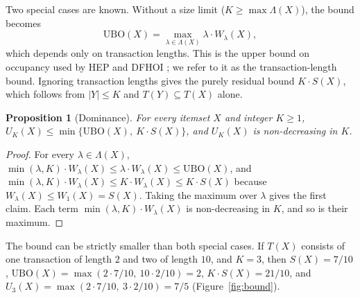 \documentclass[pdflatex,sn-mathphys,Numbered]{sn-jnl}
\theoremstyle{thmstyleone}
\newtheorem{proposition}[theorem]{Proposition}
\theoremstyle{thmstyletwo}
\theoremstyle{thmstylethree}
\newcommand{\Ubo}{\mathrm{UBO}}
\newcommand{\Ucap}{U}
\begin{document}
Two special cases are known. Without a size limit ($K \ge \max \Lambda(X)$), the bound becomes
\begin{equation}\label{eq:ubo}
\Ubo(X) = \max_{\lambda \in \Lambda(X)} \lambda \cdot W_\lambda(X),
\end{equation}
which depends only on transaction lengths. This is the upper bound on occupancy used by HEP and DFHOI \cite{deng2020hoi,nguyen2023dfhoi}; we refer to it as the transaction-length bound. Ignoring transaction lengths gives the purely residual bound $K \cdot S(X)$, which follows from $|Y| \le K$ and $T(Y) \subseteq T(X)$ alone.

\begin{proposition}[Dominance]\label{prop:dominance}
For every itemset $X$ and integer $K \ge 1$, $\Ucap_K(X) \le \min\{\Ubo(X),\ K \cdot S(X)\}$, and $\Ucap_K(X)$ is non-decreasing in $K$.
\end{proposition}
\begin{proof}
For every $\lambda \in \Lambda(X)$, $\min(\lambda, K) \cdot W_\lambda(X) \le \lambda \cdot W_\lambda(X) \le \Ubo(X)$, and $\min(\lambda, K) \cdot W_\lambda(X) \le K \cdot W_\lambda(X) \le K \cdot S(X)$ because $W_\lambda(X) \le W_1(X) = S(X)$. Taking the maximum over $\lambda$ gives the first claim. Each term $\min(\lambda,K) \cdot W_\lambda(X)$ is non-decreasing in $K$, and so is their maximum.
\end{proof}

The bound can be strictly smaller than both special cases. If $T(X)$ consists of one transaction of length $2$ and two of length $10$, and $K = 3$, then $S(X) = 7/10$, $\Ubo(X) = \max(2 \cdot 7/10,\ 10 \cdot 2/10) = 2$, $K \cdot S(X) = 21/10$, and $\Ucap_3(X) = \max(2 \cdot 7/10,\ 3 \cdot 2/10) = 7/5$ (Figure~\ref{fig:bound}).
\end{document}
